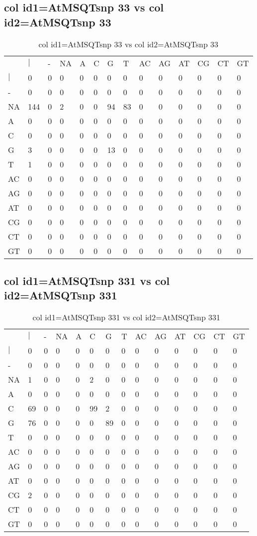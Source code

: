 \subsection{col id1=AtMSQTsnp 33 vs col id2=AtMSQTsnp 33}
\begin{center}
\begin{longtable}{|l|l|l|l|l|l|l|l|l|l|l|l|l|l|}
\caption{col id1=AtMSQTsnp 33 vs col id2=AtMSQTsnp 33} \label{table_dm858}\\
\hline
\\
\hline
&$|$&-&NA&A&C&G&T&AC&AG&AT&CG&CT&GT\\
$|$&0&0&0&0&0&0&0&0&0&0&0&0&0\\
-&0&0&0&0&0&0&0&0&0&0&0&0&0\\
NA&144&0&2&0&0&94&83&0&0&0&0&0&0\\
A&0&0&0&0&0&0&0&0&0&0&0&0&0\\
C&0&0&0&0&0&0&0&0&0&0&0&0&0\\
G&3&0&0&0&0&13&0&0&0&0&0&0&0\\
T&1&0&0&0&0&0&0&0&0&0&0&0&0\\
AC&0&0&0&0&0&0&0&0&0&0&0&0&0\\
AG&0&0&0&0&0&0&0&0&0&0&0&0&0\\
AT&0&0&0&0&0&0&0&0&0&0&0&0&0\\
CG&0&0&0&0&0&0&0&0&0&0&0&0&0\\
CT&0&0&0&0&0&0&0&0&0&0&0&0&0\\
GT&0&0&0&0&0&0&0&0&0&0&0&0&0\\
\hline
\end{longtable}
\end{center}

\subsection{col id1=AtMSQTsnp 331 vs col id2=AtMSQTsnp 331}
\begin{center}
\begin{longtable}{|l|l|l|l|l|l|l|l|l|l|l|l|l|l|}
\caption{col id1=AtMSQTsnp 331 vs col id2=AtMSQTsnp 331} \label{table_dm860}\\
\hline
\\
\hline
&$|$&-&NA&A&C&G&T&AC&AG&AT&CG&CT&GT\\
$|$&0&0&0&0&0&0&0&0&0&0&0&0&0\\
-&0&0&0&0&0&0&0&0&0&0&0&0&0\\
NA&1&0&0&0&2&0&0&0&0&0&0&0&0\\
A&0&0&0&0&0&0&0&0&0&0&0&0&0\\
C&69&0&0&0&99&2&0&0&0&0&0&0&0\\
G&76&0&0&0&0&89&0&0&0&0&0&0&0\\
T&0&0&0&0&0&0&0&0&0&0&0&0&0\\
AC&0&0&0&0&0&0&0&0&0&0&0&0&0\\
AG&0&0&0&0&0&0&0&0&0&0&0&0&0\\
AT&0&0&0&0&0&0&0&0&0&0&0&0&0\\
CG&2&0&0&0&0&0&0&0&0&0&0&0&0\\
CT&0&0&0&0&0&0&0&0&0&0&0&0&0\\
GT&0&0&0&0&0&0&0&0&0&0&0&0&0\\
\hline
\end{longtable}
\end{center}


